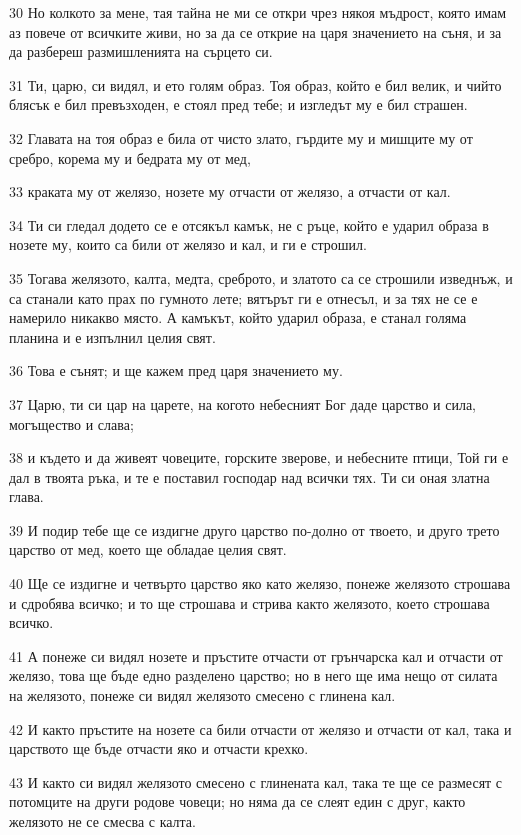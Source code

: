 \par 30 Но колкото за мене, тая тайна не ми се откри чрез някоя мъдрост, която имам аз повече от всичките живи, но за да се открие на царя значението на съня, и за да разбереш размишленията на сърцето си.
\par 31 Ти, царю, си видял, и ето голям образ. Тоя образ, който е бил велик, и чийто блясък е бил превъзходен, е стоял пред тебе; и изгледът му е бил страшен.
\par 32 Главата на тоя образ е била от чисто злато, гърдите му и мишците му от сребро, корема му и бедрата му от мед,
\par 33 краката му от желязо, нозете му отчасти от желязо, а отчасти от кал.
\par 34 Ти си гледал додето се е отсякъл камък, не с ръце, който е ударил образа в нозете му, които са били от желязо и кал, и ги е строшил.
\par 35 Тогава желязото, калта, медта, среброто, и златото са се строшили изведнъж, и са станали като прах по гумното лете; вятърът ги е отнесъл, и за тях не се е намерило никакво място. А камъкът, който ударил образа, е станал голяма планина и е изпълнил целия свят.
\par 36 Това е сънят; и ще кажем пред царя значението му.
\par 37 Царю, ти си цар на царете, на когото небесният Бог даде царство и сила, могъщество и слава;
\par 38 и където и да живеят човеците, горските зверове, и небесните птици, Той ги е дал в твоята ръка, и те е поставил господар над всички тях. Ти си оная златна глава.
\par 39 И подир тебе ще се издигне друго царство по-долно от твоето, и друго трето царство от мед, което ще обладае целия свят.
\par 40 Ще се издигне и четвърто царство яко като желязо, понеже желязото строшава и сдробява всичко; и то ще строшава и стрива както желязото, което строшава всичко.
\par 41 А понеже си видял нозете и пръстите отчасти от грънчарска кал и отчасти от желязо, това ще бъде едно разделено царство; но в него ще има нещо от силата на желязото, понеже си видял желязото смесено с глинена кал.
\par 42 И както пръстите на нозете са били отчасти от желязо и отчасти от кал, така и царството ще бъде отчасти яко и отчасти крехко.
\par 43 И както си видял желязото смесено с глинената кал, така те ще се размесят с потомците на други родове човеци; но няма да се слеят един с друг, както желязото не се смесва с калта.
